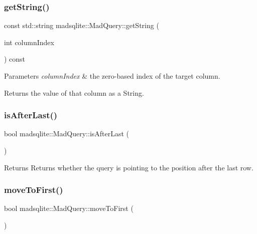 \subsubsection{\texorpdfstring{get\+String()}{getString()}}
{\footnotesize\ttfamily const std\+::string madsqlite\+::\+Mad\+Query\+::get\+String (\begin{DoxyParamCaption}\item[{int}]{column\+Index }\end{DoxyParamCaption}) const}


\begin{DoxyParams}{Parameters}
{\em column\+Index} & the zero-\/based index of the target column. \\
\hline
\end{DoxyParams}
\begin{DoxyReturn}{Returns}
the value of that column as a String. 
\end{DoxyReturn}
\hypertarget{classmadsqlite_1_1_mad_query_a0fa757aa8333e3fc53c57442bdf4cad7}{}\label{classmadsqlite_1_1_mad_query_a0fa757aa8333e3fc53c57442bdf4cad7} 
\subsubsection{\texorpdfstring{is\+After\+Last()}{isAfterLast()}}
{\footnotesize\ttfamily bool madsqlite\+::\+Mad\+Query\+::is\+After\+Last (\begin{DoxyParamCaption}{ }\end{DoxyParamCaption})}

\begin{DoxyReturn}{Returns}
Returns whether the query is pointing to the position after the last row. 
\end{DoxyReturn}
\hypertarget{classmadsqlite_1_1_mad_query_a37a601031ecedf20e53b8c0f610f74b0}{}\label{classmadsqlite_1_1_mad_query_a37a601031ecedf20e53b8c0f610f74b0} 
\subsubsection{\texorpdfstring{move\+To\+First()}{moveToFirst()}}
{\footnotesize\ttfamily bool madsqlite\+::\+Mad\+Query\+::move\+To\+First (\begin{DoxyParamCaption}{ }\end{DoxyParamCaption})}

